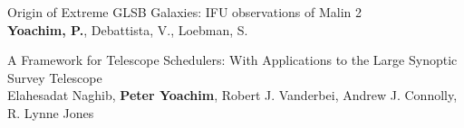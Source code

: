 


{\sc Origin of Extreme GLSB Galaxies:  IFU observations of Malin 2}\\
{\bf Yoachim, P.}, Debattista, V., Loebman, S.

{\sc A Framework for Telescope Schedulers: With Applications to the Large Synoptic Survey Telescope}\\
Elahesadat Naghib, {\bf Peter Yoachim}, Robert J. Vanderbei, Andrew J. Connolly, R. Lynne Jones


\nocite{*}





